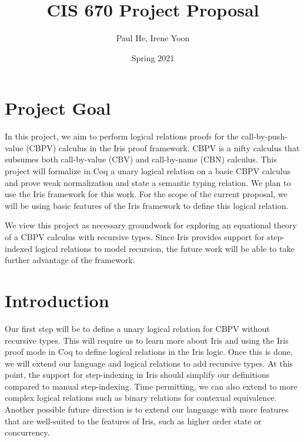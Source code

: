 \documentclass[11pt,twoside]{article}
\begin{document}
\title{CIS 670 Project Proposal}
\author{Paul He, Irene Yoon}
\date{Spring 2021}

\maketitle{}

\section{Project Goal}
In this project, we aim to perform logical relations proofs for the call-by-push-value (CBPV) calculus in the Iris proof framework.
CBPV is a nifty calculus that subsumes both call-by-value (CBV) and call-by-name (CBN) calculus.
This project will formalize in Coq a unary logical relation on a basic CBPV calculus and prove weak normalization and state a semantic typing relation.
We plan to use the Iris framework for this work.
For the scope of the current proposal, we will be using basic features of the Iris framework to define this logical relation.

We view this project as necessary groundwork for exploring an equational theory of a CBPV calculus with recursive types.
Since Iris provides support for step-indexed logical relations to model recursion, the future work will be able to take further advantage of the framework.

\section{Introduction}

Our first step will be to define a unary logical relation for CBPV without recursive types.
This will require us to learn more about Iris and using the Iris proof mode in Coq to define logical relations in the Iris logic.
Once this is done, we will extend our language and logical relations to add recursive types.
At this point, the support for step-indexing in Iris should simplify our definitions compared to manual step-indexing.
Time permitting, we can also extend to more complex logical relations such as binary relations for contexual equivalence.
Another possible future direction is to extend our language with more features that are well-suited to the features of Iris, such as higher order state or concurrency. \\
\end{document}
